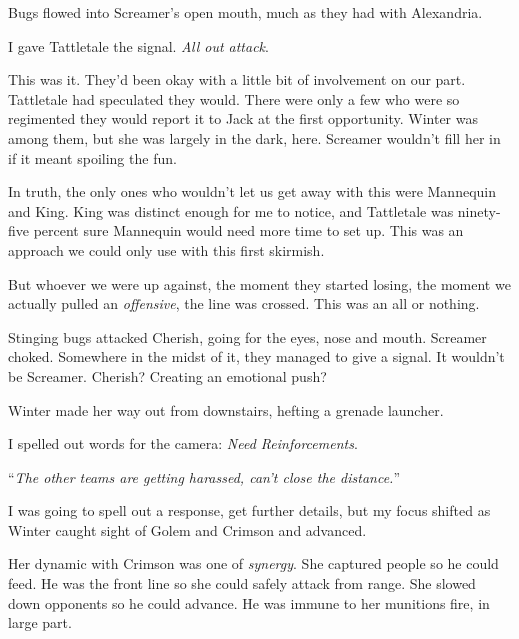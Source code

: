 Bugs flowed into Screamer's open mouth, much as they had with Alexandria.



I gave Tattletale the signal.  \emph{All out attack}.



This was it.  They'd been okay with a little bit of involvement on our part.  Tattletale had speculated they would.  There were only a few who were so regimented they would report it to Jack at the first opportunity.  Winter was among them, but she was largely in the dark, here.  Screamer wouldn't fill her in if it meant spoiling the fun.



In truth, the only ones who wouldn't let us get away with this were Mannequin and King.  King was distinct enough for me to notice, and Tattletale was ninety-five percent sure Mannequin would need more time to set up.  This was an approach we could only use with this first skirmish.



But whoever we were up against, the moment they started losing, the moment we actually pulled an \emph{offensive}, the line was crossed.  This was an all or nothing.



Stinging bugs attacked Cherish, going for the eyes, nose and mouth.  Screamer choked.  Somewhere in the midst of it, they managed to give a signal.  It wouldn't be Screamer.  Cherish?  Creating an emotional push?



Winter made her way out from downstairs, hefting a grenade launcher.



I spelled out words for the camera: \emph{Need Reinforcements}.



``\emph{The other teams are getting harassed, can't close the distance.}''



I was going to spell out a response, get further details, but my focus shifted as Winter caught sight of Golem and Crimson and advanced.



Her dynamic with Crimson was one of \emph{synergy}.  She captured people so he could feed.  He was the front line so she could safely attack from range.  She slowed down opponents so he could advance.  He was immune to her munitions fire, in large part.



